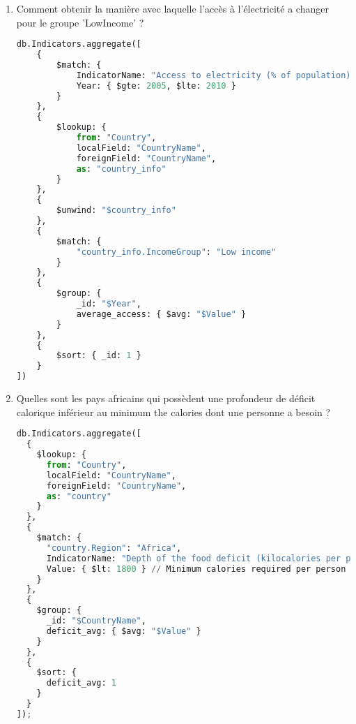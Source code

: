 \begin{enumerate}
    \item Comment obtenir la manière avec laquelle l’accès à l’électricité a changer pour le groupe ’LowIncome’ ?
\begin{lstlisting}[language=Python]
db.Indicators.aggregate([
    {
        $match: {
            IndicatorName: "Access to electricity (% of population)",
            Year: { $gte: 2005, $lte: 2010 }
        }
    },
    {
        $lookup: {
            from: "Country",
            localField: "CountryName",
            foreignField: "CountryName",
            as: "country_info"
        }
    },
    {
        $unwind: "$country_info"
    },
    {
        $match: {
            "country_info.IncomeGroup": "Low income"
        }
    },
    {
        $group: {
            _id: "$Year",
            average_access: { $avg: "$Value" }
        }
    },
    {
        $sort: { _id: 1 }
    }
])
\end{lstlisting}
    \item Quelles sont les pays africains qui possèdent une profondeur de déficit calorique inférieur au
    minimum the calories dont une personne a besoin ?
\begin{lstlisting}[language=Python]
db.Indicators.aggregate([
  {
    $lookup: {
      from: "Country",
      localField: "CountryName",
      foreignField: "CountryName",
      as: "country"
    }
  },
  {
    $match: {
      "country.Region": "Africa",
      IndicatorName: "Depth of the food deficit (kilocalories per person per day)",
      Value: { $lt: 1800 } // Minimum calories required per person per day
    }
  },
  {
    $group: {
      _id: "$CountryName",
      deficit_avg: { $avg: "$Value" }
    }
  },
  {
    $sort: {
      deficit_avg: 1
    }
  }
]);

\end{lstlisting}

\end{enumerate}

